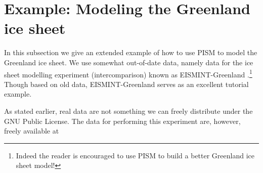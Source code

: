 \documentclass[11pt,final]{amsart}
\begin{document}

\clearpage\newpage
\section{Example: Modeling the Greenland ice sheet}\label{sect:green}  In this subsection we give an extended example of how to use PISM to model the Greenland ice sheet.  We use somewhat out-of-date data, namely data for the ice sheet modelling experiment (intercomparison) known as EISMINT-Greenland \cite{RitzEISMINT}.\footnote{Indeed the reader is encouraged to use PISM to build a better Greenland ice sheet model!}  Though based on old data, EISMINT-Greenland serves as an excellent tutorial example.  

As stated earlier, real data are not something we can freely distribute under the GNU Public License.  The data for performing this experiment are, however, freely available at
\medskip
\end{document}
